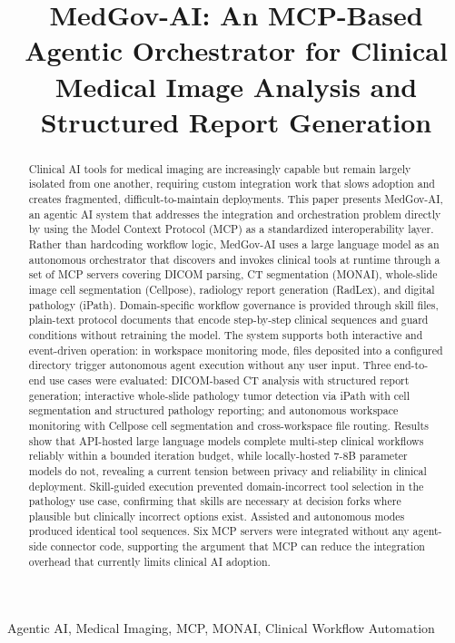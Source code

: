 \documentclass[conference]{IEEEtran}
\title{MedGov-AI: An MCP-Based Agentic Orchestrator for Clinical Medical Image Analysis and Structured Report Generation}
\begin{document}
\maketitle

\begin{abstract}
Clinical AI tools for medical imaging are increasingly capable but remain largely isolated from one another, requiring custom integration work that slows adoption and creates fragmented, difficult-to-maintain deployments. This paper presents MedGov-AI, an agentic AI system that addresses the integration and orchestration problem directly by using the Model Context Protocol (MCP) as a standardized interoperability layer. Rather than hardcoding workflow logic, MedGov-AI uses a large language model as an autonomous orchestrator that discovers and invokes clinical tools at runtime through a set of MCP servers covering DICOM parsing, CT segmentation (MONAI), whole-slide image cell segmentation (Cellpose), radiology report generation (RadLex), and digital pathology (iPath). Domain-specific workflow governance is provided through skill files, plain-text protocol documents that encode step-by-step clinical sequences and guard conditions without retraining the model. The system supports both interactive and event-driven operation: in workspace monitoring mode, files deposited into a configured directory trigger autonomous agent execution without any user input. Three end-to-end use cases were evaluated: DICOM-based CT analysis with structured report generation; interactive whole-slide pathology tumor detection via iPath with cell segmentation and structured pathology reporting; and autonomous workspace monitoring with Cellpose cell segmentation and cross-workspace file routing. Results show that API-hosted large language models complete multi-step clinical workflows reliably within a bounded iteration budget, while locally-hosted 7-8B parameter models do not, revealing a current tension between privacy and reliability in clinical deployment. Skill-guided execution prevented domain-incorrect tool selection in the pathology use case, confirming that skills are necessary at decision forks where plausible but clinically incorrect options exist. Assisted and autonomous modes produced identical tool sequences. Six MCP servers were integrated without any agent-side connector code, supporting the argument that MCP can reduce the integration overhead that currently limits clinical AI adoption.
\end{abstract}

\begin{IEEEkeywords}
Agentic AI, Medical Imaging, MCP, MONAI, Clinical Workflow Automation
\end{IEEEkeywords}
\end{document}

